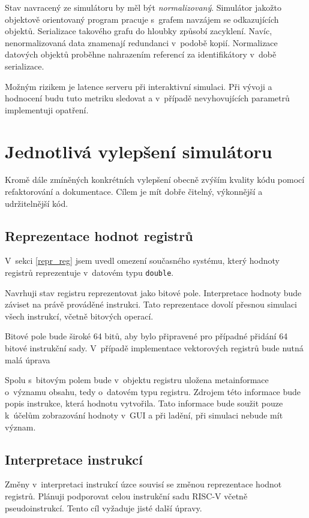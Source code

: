 Stav navracený ze simulátoru by měl být \emph{normalizovaný}.
Simulátor jakožto objektově orientovaný program pracuje s~grafem navzájem se odkazujících objektů.
Serializace takového grafu do hloubky způsobí zacyklení.
Navíc, nenormalizovaná data znamenají redundanci v~podobě kopií.
Normalizace datových objektů proběhne nahrazením referencí za identifikátory v~době serializace.

Možným rizikem je latence serveru při interaktivní simulaci.
Při vývoji a hodnocení budu tuto metriku sledovat a v~případě nevyhovujících parametrů implementuji opatření.

\section{Jednotlivá vylepšení simulátoru}
\label{rozsireniJava}

Kromě dále zmíněných konkrétních vylepšení obecně zvýším kvality kódu pomocí refaktorování a dokumentace.
Cílem je mít dobře čitelný, výkonnější a udržitelnější kód.

\subsection{Reprezentace hodnot registrů}

V~sekci \ref{repr_reg} jsem uvedl omezení současného systému, který hodnoty registrů reprezentuje v~datovém typu \texttt{double}. 

Navrhuji stav registru reprezentovat jako bitové pole.
Interpretace hodnoty bude záviset na právě prováděné instrukci.
Tato reprezentace dovolí přesnou simulaci všech instrukcí, včetně bitových operací.

Bitové pole bude široké 64 bitů, aby bylo připravené pro případné přidání 64 bitové instrukční sady.
V~případě implementace vektorových registrů bude nutná malá úprava

Spolu s~bitovým polem bude v~objektu registru uložena metainformace o~významu obsahu, tedy o~datovém typu registru. Zdrojem této informace bude popis instrukce, která hodnotu vytvořila.
Tato informace bude soužit pouze k~účelům zobrazování hodnoty v~GUI a při ladění, při simulaci nebude mít význam.

\subsection{Interpretace instrukcí}
\label{instructionNewDesign}

Změny v~interpretaci instrukcí úzce souvisí se změnou reprezentace hodnot registrů. Plánuji podporovat celou instrukční sadu RISC-V včetně pseudoinstrukcí. Tento cíl vyžaduje jisté další úpravy.

